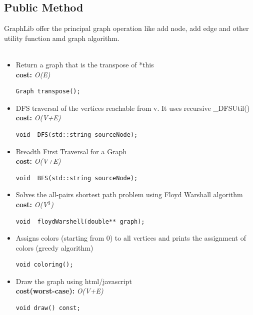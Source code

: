 \documentclass[10pt,a4paper]{article}
\begin{document}
\subsection{Public Method}
GraphLib offer the principal graph operation like add node, add edge and other utility function amd graph algorithm.\\\\
\begin{itemize}

\item Return a graph that is the transpose of *this\\
\textbf{cost:} \emph{O(E)}
\begin{lstlisting}
Graph transpose();
\end{lstlisting}   

\item DFS traversal of the vertices reachable from v. It uses recursive \_DFSUtil()\\
\textbf{cost:} \emph{O(V+E)}
\begin{lstlisting}
void  DFS(std::string sourceNode); 
\end{lstlisting}   

\item Breadth First Traversal for a Graph\\
\textbf{cost:} \emph{O(V+E)}
\begin{lstlisting}
void  BFS(std::string sourceNode);
\end{lstlisting} 

\item Solves the all-pairs shortest path problem using Floyd Warshall algorithm\\
\textbf{cost:} \emph{O(V$^3$)}
\begin{lstlisting}
void  floydWarshell(double** graph);
\end{lstlisting} 

\item Assigns colors (starting from 0) to all vertices and prints the assignment of colors (greedy algorithm)
\begin{lstlisting}
void coloring(); 
\end{lstlisting}   

\item Draw the graph using html/javascript\\
\textbf{cost(worst-case):} \emph{O(V+E)}
\begin{lstlisting}
void draw() const; 
\end{lstlisting}


\end{itemize}
\end{document}
